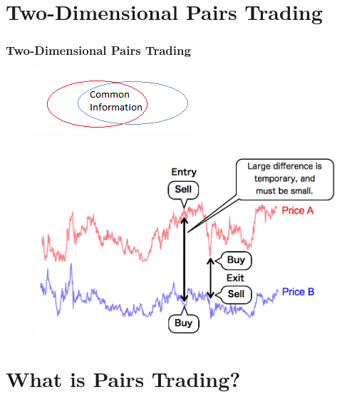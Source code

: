 \documentclass[pdf,9pt,xcolor=dvipsnames,hide notes]{beamer}
\begin{document}
		\section{Two-Dimensional Pairs Trading}	

	\begin{frame}
		\frametitle{Two-Dimensional Pairs Trading}
		
		\begin{figure}[htbp]
			\centering
			\includegraphics[scale=0.5]{fig1.png}
			\label{fig:fig1}
		\end{figure}
		
		\begin{figure}[htbp]
			\centering
			\includegraphics[scale=0.38]{fig2.png}
			\label{fig:fig2}
		\end{figure}
		
	\end{frame}
	
	\section{What is Pairs Trading?}
	
\end{document}
